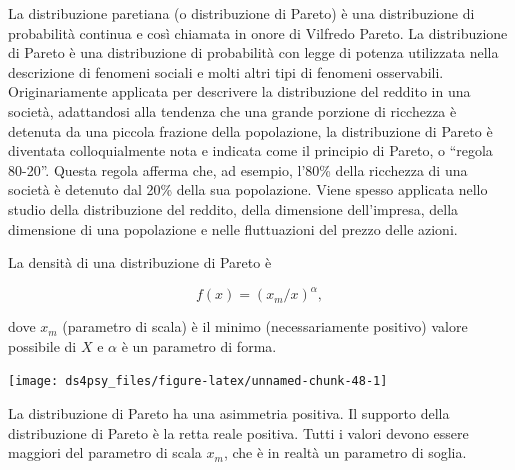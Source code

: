 \documentclass[
  11pt,
]{krantz}
\theoremstyle{definition}
\theoremstyle{definition}
\theoremstyle{definition}
\theoremstyle{definition}
\theoremstyle{remark}
\begin{document}
La distribuzione paretiana (o distribuzione di Pareto) è una distribuzione di probabilità continua e così chiamata in onore di Vilfredo Pareto. La distribuzione di Pareto è una distribuzione di probabilità con legge di potenza utilizzata nella descrizione di fenomeni sociali e molti altri tipi di fenomeni osservabili. Originariamente applicata per descrivere la distribuzione del reddito in una società, adattandosi alla tendenza che una grande porzione di ricchezza è detenuta da una piccola frazione della popolazione, la distribuzione di Pareto è diventata colloquialmente nota e indicata come il principio di Pareto, o ``regola 80-20''. Questa regola afferma che, ad esempio, l'80\% della ricchezza di una società è detenuto dal 20\% della sua popolazione. Viene spesso applicata nello studio della distribuzione del reddito, della dimensione dell'impresa, della dimensione di una popolazione e nelle fluttuazioni del prezzo delle azioni.

La densità di una distribuzione di Pareto è

\[
f(x)=(x_m/x)^\alpha,
\]

dove \(x_m\) (parametro di scala) è il minimo (necessariamente positivo) valore possibile di \(X\) e \(\alpha\) è un parametro di forma.

\begin{center}\texttt{[image: ds4psy\_files/figure-latex/unnamed-chunk-48-1]} \end{center}

\noindent La distribuzione di Pareto ha una asimmetria positiva. Il supporto della distribuzione di Pareto è la retta reale positiva. Tutti i valori devono essere maggiori del parametro di scala \(x_m\), che è in realtà un parametro di soglia.

  

\printindex
\end{document}
